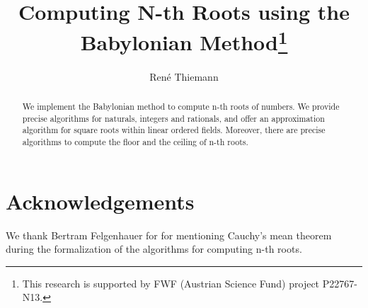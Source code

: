 \documentclass[11pt,a4paper]{article}
\begin{document}
\title{Computing N-th Roots using the Babylonian Method\thanks{This research is supported by FWF (Austrian Science Fund) project P22767-N13.}}
\author{Ren\'e Thiemann}
\maketitle

\begin{abstract}
  We implement the Babylonian method \cite{Babylon} to compute n-th roots of numbers.
  We provide precise algorithms for naturals, integers and rationals, and
  offer an approximation algorithm for square roots within linear ordered fields. Moreover, there
  are precise algorithms to compute the floor and the ceiling of n-th roots. 
\end{abstract}

\tableofcontents




\section*{Acknowledgements}
We thank Bertram Felgenhauer for 
for mentioning Cauchy's mean theorem during the formalization of
the algorithms for computing n-th roots.



\end{document}
